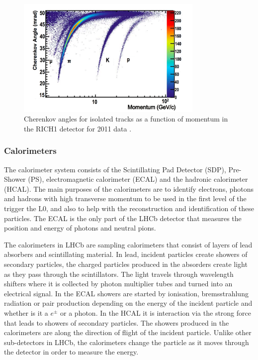 \begin{figure}[htb]
  \centering
  \includegraphics[width=0.8\textwidth]{./Figs/LHC_LHCb/RICH1_performance.png}
  \caption{Cherenkov angles for isolated tracks as a function of momentum in the RICH1 detector for 2011 data \cite{Adinolfi:2012qfa}.}
  \label{fig:RICH_preformance}
\end{figure}


\subsubsection{Calorimeters}
\label{Calo}

The calorimeter system consists of the Scintillating Pad Detector (SDP), Pre-Shower (PS), electromagnetic calorimeter (ECAL) and the hadronic calorimeter (HCAL). The main purposes of the calorimeters are to identify electrons, photons and hadrons with high transverse momentum to be used in the first level of the trigger the L0, and also to help with the reconstruction and identification of these particles. The ECAL is the only part of the LHCb detector that measures the position and energy of photons and neutral pions. 

The calorimeters in LHCb are sampling calorimeters that consist of layers of lead absorbers and scintillating material. In lead, incident particles create showers of secondary particles, the charged particles produced in the absorders create light as they pass through the scintillators. The light travels through wavelength shifters where it is collected by photon multiplier tubes and turned into an electrical signal. In the ECAL showers are started by ionisation, bremsstrahlung radiation or pair production depending on the energy of the incident particle and whether is it a $e^{\pm}$ or a photon. In the HCAL it is interaction via the strong force that leads to showers of secondary particles. The showers produced in the calorimeters are along the direction of flight of the incident particle. Unlike other sub-detectors in LHCb, the calorimeters change the particle as it moves through the detector in order to measure the energy.

